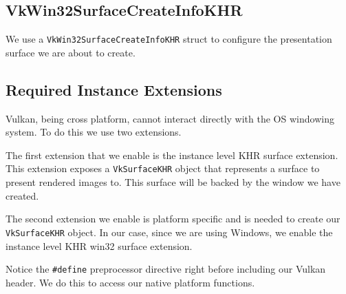 \begin{minipage}{\linewidth}{\noindent}
    
\end{minipage}

\subsection{VkWin32SurfaceCreateInfoKHR}

We use a \texttt{VkWin32SurfaceCreateInfoKHR} struct to configure the
presentation surface we are about to create.

\begin{minipage}{\linewidth}{\noindent}
    
\end{minipage}

\subsection{Required Instance Extensions}

Vulkan, being cross platform, cannot interact directly with the OS windowing system.
To do this we use two extensions.

The first extension that we enable is the instance level KHR surface extension.
This extension exposes a \texttt{VkSurfaceKHR} object that represents a surface to present
rendered images to.
This surface will be backed by the window we have created.

The second extension we enable is platform specific and is needed
to create our \texttt{VkSurfaceKHR} object.
In our case, since we are using Windows, we enable the instance level KHR win32
surface extension.

\begin{minipage}{\linewidth}{\noindent}
    
\end{minipage}

Notice the \texttt{\#define} preprocessor directive right before including
our Vulkan header.
We do this to access our native platform functions.

